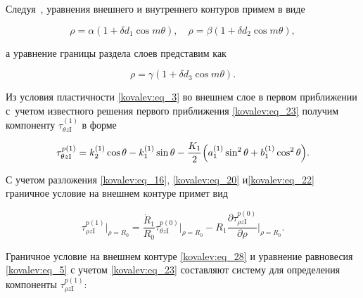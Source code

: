 Следуя~\cite{kovalev:bibl_10}, уравнения внешнего и внутреннего контуров примем в виде

 \begin{equation}

\label{kovalev:eq_25}

  \rho=\alpha (1+\delta d_1\cos m\theta ), \quad \rho=\beta (1+\delta d_2\cos m\theta ),

 \end{equation}

а уравнение границы раздела слоев представим как

 \begin{equation}

\label{kovalev:eq_26}

  \rho=\gamma (1+\delta d_3\cos m\theta ).

 \end{equation}





Из условия пластичности \eqref{kovalev:eq_3} во внешнем слое в первом приближении с~учетом известного решения первого приближения \eqref{kovalev:eq_23} получим компоненту $\tau_{\theta z\mathrm{I}}^{(1)}$ в форме

 \begin{equation}

\label{kovalev:eq_27}

  \tau_{\theta z\mathrm{I}}^{p(1)}=k_2^{(1)}\cos\theta-k_1^{(1)}\sin\theta-\dfrac{K_1}{2}\Bigl(a_1^{(1)}\sin^2\theta+b_1^{(1)}\cos^2\theta\Bigr).

 \end{equation}

С учетом разложения \eqref{kovalev:eq_16}, \eqref{kovalev:eq_20} и\eqref{kovalev:eq_22} граничное условие на внешнем контуре примет вид

 \begin{equation}\label{kovalev:eq_28}

  \tau_{\rho z\mathrm{I}}^{p(1)}\Bigr|_{\rho=R_0}=

  \dfrac{\dot{R}_1}{R_0}\tau_{\theta z\mathrm{I}}^{p(0)}\Bigr|_{\rho=R_0}-

R_1\dfrac{\partial \tau_{\rho z\mathrm{I}}^{p(0)}}{\partial\rho}\Bigr|_{\rho=R_0}.

 \end{equation}



Граничное условие на внешнем контуре \eqref{kovalev:eq_28} и уравнение равновесия \eqref{kovalev:eq_5} с учетом \eqref{kovalev:eq_23} составляют систему для определения компоненты $\tau_{\rho z\mathrm{I}}^{p(1)}$:


